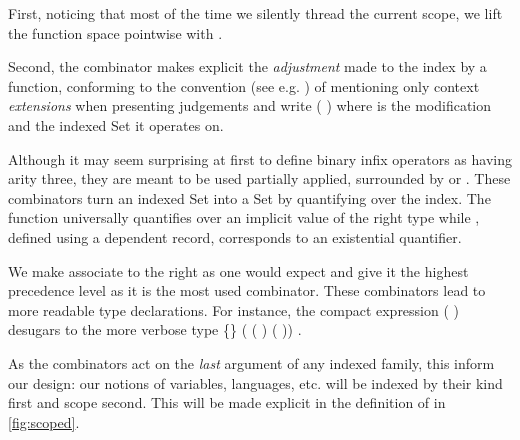 First, noticing that most of the time we silently thread the current scope, we lift
the function space pointwise with .


Second, the  combinator makes explicit the \emph{adjustment} made to the
index by a function, conforming to the convention (see e.g. \cite{martin1982constructive})
of mentioning only context \emph{extensions} when presenting judgements and write
({  }) where  is the modification and  the indexed
Set it operates on.


Although it may seem surprising at first to define binary infix operators as having
arity three, they are meant to be used partially applied, surrounded by 
or . These combinators turn an indexed Set into a Set by quantifying over
the index. The function  universally quantifies over an implicit value
of the right type while , defined using a dependent record, corresponds
to an existential quantifier.


\begin{minipage}[t]{0.6\textwidth}
\end{minipage}
\begin{minipage}[t]{0.4\textwidth}
\end{minipage}

We make  associate to the right as one would expect and give it the
highest precedence level as it is the most used combinator. These combinators
lead to more readable type declarations.  For instance, the compact expression
\AF{∀[}   (  )   \AF{]}
desugars to the more verbose type
 \{\}  ( ( )   ( ))   .

As the combinators act on the \emph{last} argument of any indexed family, this inform our
design: our notions of variables, languages, etc. will be indexed by their kind first and
scope second. This will be made explicit in the definition of  in
\cref{fig:scoped}.
